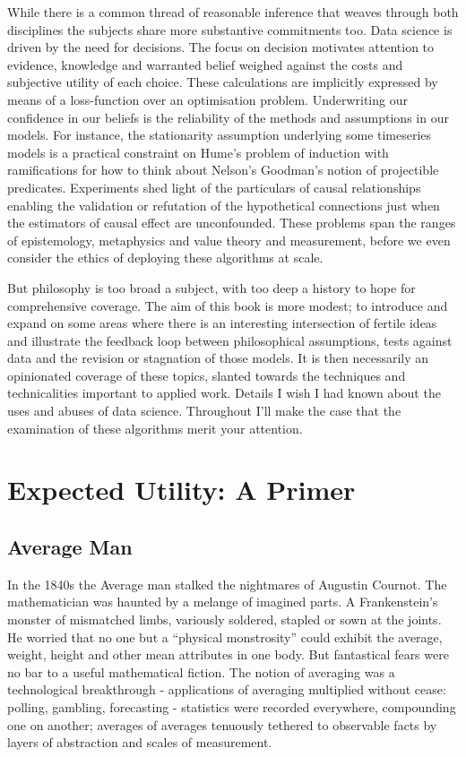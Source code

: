 \documentclass[]{tufte-book}
\theoremstyle{definition}
\theoremstyle{definition}
\theoremstyle{definition}
\theoremstyle{remark}
\begin{document}
While there is a common thread of reasonable inference that weaves through both disciplines the subjects share more substantive commitments too. Data science is driven by the need for decisions. The focus on decision motivates attention to evidence, knowledge and warranted belief weighed against the costs and subjective utility of each choice. These calculations are implicitly expressed by means of a loss-function over an optimisation problem. Underwriting our confidence in our beliefs is the reliability of the methods and assumptions in our models. For instance, the stationarity assumption underlying some timeseries models is a practical constraint on Hume's problem of induction with ramifications for how to think about Nelson's Goodman's notion of projectible predicates. Experiments shed light of the particulars of causal relationships enabling the validation or refutation of the hypothetical connections just when the estimators of causal effect are unconfounded. These problems span the ranges of epistemology, metaphysics and value theory and measurement, before we even consider the ethics of deploying these algorithms at scale.

But philosophy is too broad a subject, with too deep a history to hope for comprehensive coverage. The aim of this book is more modest; to introduce and expand on some areas where there is an interesting intersection of fertile ideas and illustrate the feedback loop between philosophical assumptions, tests against data and the revision or stagnation of those models. It is then necessarily an opinionated coverage of these topics, slanted towards the techniques and technicalities important to applied work. Details I wish I had known about the uses and abuses of data science. Throughout I'll make the case that the examination of these algorithms merit your attention.

\hypertarget{expected-utility-a-primer}{%
\chapter{Expected Utility: A Primer}\label{expected-utility-a-primer}}

\hypertarget{average-man}{%
\section{Average Man}\label{average-man}}

In the 1840s the Average man stalked the nightmares of Augustin Cournot. The mathematician was haunted by a melange of imagined parts. A Frankenstein's monster of mismatched limbs, variously soldered, stapled or sown at the joints. He worried that no one but a ``physical monstrosity'' could exhibit the average, weight, height and other mean attributes in one body. \citep{stigler2016seven} But fantastical fears were no bar to a useful mathematical fiction. The notion of averaging was a technological breakthrough - applications of averaging multiplied without cease: polling, gambling, forecasting - statistics were recorded everywhere, compounding one on another; averages of averages tenuously tethered to observable facts by layers of abstraction and scales of measurement.
\end{document}
